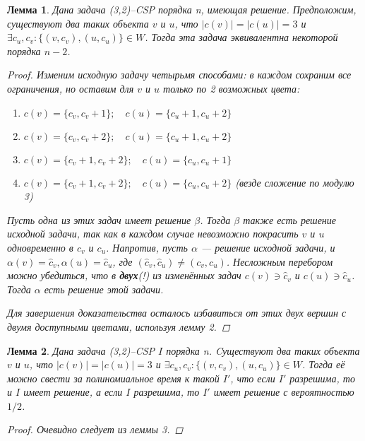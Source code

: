 \documentclass[fleqn]{article}
\theoremstyle{plain}
\theoremstyle{plain}
\theoremstyle{plain}
\newtheorem{lemma}{Лемма}
\theoremstyle{definition}
\begin{document}
\begin{lemma}
	Дана задача (3,2)--CSP порядка n, имеющая решение. Предположим, существуют два таких объекта $v$ и $u$, что $|c(v)| = |c(u)| = 3$ и $\exists c_u, c_v : \{(v, c_v), (u, c_u)\} \in W$. Тогда эта задача эквивалентна некоторой порядка $n-2$.
	\begin{proof}
		Изменим исходную задачу четырьмя способами: в каждом сохраним все ограничения, но оставим для $v$ и $u$ только по 2 возможных цвета:
		\begin{enumerate}
			\item $c(v) = \{c_v, c_v+1\}; \quad c(u) = \{c_u+1, c_u+2\}$
			\item $c(v) = \{c_v, c_v+2\}; \quad c(u) = \{c_u+1, c_u+2\}$
			\item $c(v) = \{c_v+1, c_v+2\}; \quad c(u) = \{c_u, c_u+1\}$
			\item $c(v) = \{c_v+1, c_v+2\}; \quad c(u) = \{c_u, c_u+2\}$ (везде сложение по модулю 3)
		\end{enumerate}
		Пусть одна из этих задач имеет решение $\beta$. Тогда $\beta$ также есть решение исходной задачи, так как в каждом случае невозможно покрасить $v$ и $u$ одновременно в $c_v$ и $c_u$. Напротив, пусть $\alpha$ --- решение исходной задачи, и $\alpha(v) = \widehat{c}_v, \alpha(u) = \widehat{c}_u$, где $(\widehat{c}_v, \widehat{c}_u) \not= (c_v, c_u)$. Несложным перебором можно убедиться, что в \textbf{двух}(!) из изменённых задач $c(v) \ni \widehat{c}_v$ и $c(u) \ni \widehat{c}_u$. Тогда $\alpha$ есть решение этой задачи.
		
		Для завершения доказательства осталось избавиться от этих двух вершин с двумя доступными цветами, используя лемму 2.
	\end{proof}
\end{lemma}

\begin{lemma}
	Дана задача (3,2)--CSP $I$ порядка n. Cуществуют два таких объекта $v$ и $u$, что $|c(v)| = |c(u)| = 3$ и $\exists c_u, c_v : \{(v, c_v), (u, c_u)\} \in W$. Тогда её можно свести за полиномиальное время к такой $I'$, что если $I'$ разрешима, то и $I$ имеет решение, а если $I$ разрешима, то $I'$ имеет решение с вероятностью $1/2$.
	\begin{proof}
		Очевидно следует из леммы 3.
	\end{proof}
\end{lemma}
\end{document}
